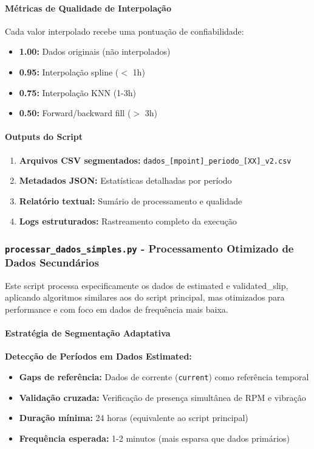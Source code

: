 \paragraph{Métricas de Qualidade de Interpolação}

Cada valor interpolado recebe uma pontuação de confiabilidade:
\begin{itemize}
    \item \textbf{1.00:} Dados originais (não interpolados)
    \item \textbf{0.95:} Interpolação spline ($<$ 1h)
    \item \textbf{0.75:} Interpolação KNN (1-3h)
    \item \textbf{0.50:} Forward/backward fill ($>$ 3h)
\end{itemize}

\paragraph{Outputs do Script}

\begin{enumerate}
    \item \textbf{Arquivos CSV segmentados:} \texttt{dados\_[mpoint]\_periodo\_[XX]\_v2.csv}
    \item \textbf{Metadados JSON:} Estatísticas detalhadas por período
    \item \textbf{Relatório textual:} Sumário de processamento e qualidade
    \item \textbf{Logs estruturados:} Rastreamento completo da execução
\end{enumerate}

\subsubsection{\texttt{processar\_dados\_simples.py} - Processamento Otimizado de Dados Secundários}

Este script processa especificamente os dados de estimated e validated\_slip, aplicando algoritmos similares aos do script principal, mas otimizados para performance e com foco em dados de frequência mais baixa.

\paragraph{Estratégia de Segmentação Adaptativa}

\textbf{Detecção de Períodos em Dados Estimated:}
\begin{itemize}
    \item \textbf{Gaps de referência:} Dados de corrente (\texttt{current}) como referência temporal
    \item \textbf{Validação cruzada:} Verificação de presença simultânea de RPM e vibração
    \item \textbf{Duração mínima:} 24 horas (equivalente ao script principal)
    \item \textbf{Frequência esperada:} 1-2 minutos (mais esparsa que dados primários)
\end{itemize}

